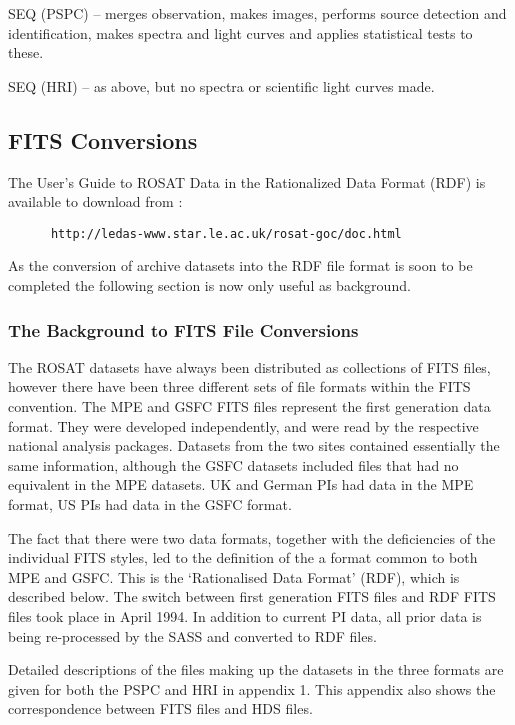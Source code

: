 \documentclass[11pt,fleqn]{article}    %
\begin{document}
SEQ (PSPC) -- merges observation, makes images, performs source detection
and identification, makes spectra and light curves and applies
statistical tests to these.

SEQ (HRI) -- as above, but no spectra or scientific light curves made.

\subsection{FITS Conversions}

The User's Guide to  ROSAT Data in the   Rationalized Data Format  (RDF) is
available to download from :

\begin{verbatim}
      http://ledas-www.star.le.ac.uk/rosat-goc/doc.html
\end{verbatim} 

As the conversion of archive datasets into the RDF file format is soon to be 
completed the following section is now only useful as background.

\subsubsection{The Background to FITS File Conversions}
The ROSAT datasets have always been distributed as collections of FITS
files, however there have been three different sets of file formats
within the  FITS convention. The MPE and GSFC FITS files represent the first
generation data format. They were developed independently, and were read by
the respective national analysis packages.  Datasets from the two sites
contained essentially the same information, although the GSFC datasets
included files that had no equivalent in the MPE datasets. UK and German
PIs had data in the MPE format, US PIs had data in the GSFC format.

The fact that there were two data formats, together with the
deficiencies of the individual FITS styles, led to the definition of the
a format common to both MPE and GSFC. This is the `Rationalised Data
Format' (RDF), which is described below. The switch between first
generation FITS files and RDF FITS files took place in April 1994. In
addition to current PI data, all prior data is being re-processed by the
SASS and converted to RDF files.   

Detailed descriptions of the files making up the datasets in the three
formats are given for both the PSPC and HRI in appendix 1. This appendix
also shows the correspondence between FITS files and HDS files. 
\end{document}
